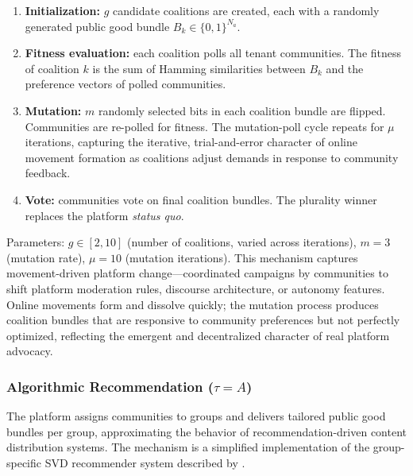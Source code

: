\documentclass[12pt]{article}
\begin{document}
\begin{enumerate}
    \item \textbf{Initialization:} $g$ candidate coalitions are created, each with a randomly generated public good bundle $B_k \in \{0,1\}^{N_a}$.
    \item \textbf{Fitness evaluation:} each coalition polls all tenant communities. The fitness of coalition $k$ is the sum of Hamming similarities between $B_k$ and the preference vectors of polled communities.
    \item \textbf{Mutation:} $m$ randomly selected bits in each coalition bundle are flipped. Communities are re-polled for fitness. The mutation-poll cycle repeats for $\mu$ iterations, capturing the iterative, trial-and-error character of online movement formation as coalitions adjust demands in response to community feedback.
    \item \textbf{Vote:} communities vote on final coalition bundles. The plurality winner replaces the platform \textit{status quo}.
\end{enumerate}

\noindent Parameters: $g \in [2,10]$ (number of coalitions, varied across iterations), $m = 3$ (mutation rate), $\mu = 10$ (mutation iterations). This mechanism captures movement-driven platform change---coordinated campaigns by communities to shift platform moderation rules, discourse architecture, or autonomy features. Online movements form and dissolve quickly; the mutation process produces coalition bundles that are responsive to community preferences but not perfectly optimized, reflecting the emergent and decentralized character of real platform advocacy.

\subsubsection{Algorithmic Recommendation ($\tau = A$)}

The platform assigns communities to groups and delivers tailored public good bundles per group, approximating the behavior of recommendation-driven content distribution systems. The mechanism is a simplified implementation of the group-specific SVD recommender system described by \cite{biGroupSpecificRecommenderSystem2017}.
\end{document}
